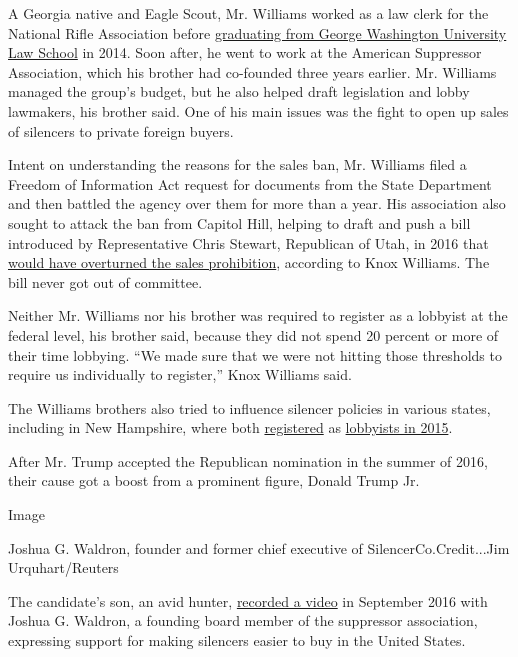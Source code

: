 A Georgia native and Eagle Scout, Mr. Williams worked as a law clerk for
the National Rifle Association before
\href{https://www.documentcloud.org/documents/6987302-A-W-H-Lawyer-Who-Helped-Loosen-Gun-Silencer.html}{graduating
from George Washington University Law School} in 2014. Soon after, he
went to work at the American Suppressor Association, which his brother
had co-founded three years earlier. Mr. Williams managed the group's
budget, but he also helped draft legislation and lobby lawmakers, his
brother said. One of his main issues was the fight to open up sales of
silencers to private foreign buyers.

Intent on understanding the reasons for the sales ban, Mr. Williams
filed a Freedom of Information Act request for documents from the State
Department and then battled the agency over them for more than a year.
His association also sought to attack the ban from Capitol Hill, helping
to draft and push a bill introduced by Representative Chris Stewart,
Republican of Utah, in 2016 that
\href{https://www.congress.gov/bill/114th-congress/house-bill/5135/all-info}{would
have overturned the sales prohibition}, according to Knox Williams. The
bill never got out of committee.

Neither Mr. Williams nor his brother was required to register as a
lobbyist at the federal level, his brother said, because they did not
spend 20 percent or more of their time lobbying. ``We made sure that we
were not hitting those thresholds to require us individually to
register,'' Knox Williams said.

The Williams brothers also tried to influence silencer policies in
various states, including in New Hampshire, where both
\href{https://www.documentcloud.org/documents/6987325-Knox-Williams-s-New-Hampshire-Lobbying.html}{registered}
as
\href{https://www.documentcloud.org/documents/6987324-Before-Shaping-Silencer-Policy-In-The-Trump-W-H.html}{lobbyists
in 2015}.

After Mr. Trump accepted the Republican nomination in the summer of
2016, their cause got a boost from a prominent figure, Donald Trump Jr.

Image

Joshua G. Waldron, founder and former chief executive of
SilencerCo.Credit...Jim Urquhart/Reuters

The candidate's son, an avid hunter,
\href{https://www.youtube.com/watch?v=0vlu2G5UkXk}{recorded a video} in
September 2016 with Joshua G. Waldron, a founding board member of the
suppressor association, expressing support for making silencers easier
to buy in the United States.

